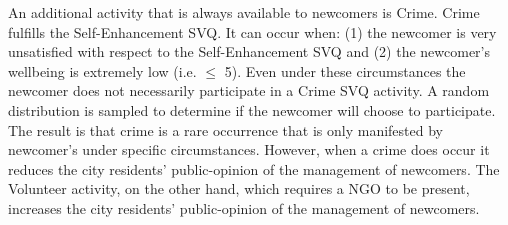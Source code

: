 \documentclass{scspaperproc}
\theoremstyle{scsthe}
\begin{document}
An additional activity that is always available to newcomers is Crime. Crime fulfills the Self-Enhancement SVQ. It can occur when: (1) the newcomer is very unsatisfied with respect to the Self-Enhancement SVQ and (2) the newcomer's wellbeing is extremely low (i.e. $\leq$ 5). Even under these circumstances the newcomer does not necessarily participate in a Crime SVQ activity. A random distribution is sampled to determine if the newcomer will choose to participate. The result is that crime is a rare occurrence that is only manifested by newcomer's under specific circumstances. However, when a crime does occur it reduces the city residents' public-opinion of the management of newcomers. The Volunteer activity, on the other hand, which requires a NGO to be present, increases the city residents' public-opinion of the management of newcomers.
\end{document}
